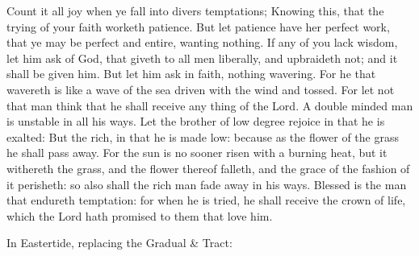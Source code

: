  Count it all joy when ye fall into divers temptations; Knowing this, that the trying of your faith worketh patience. But let patience have her perfect work, that ye may be perfect and entire, wanting nothing. If any of you lack wisdom, let him ask of God, that giveth to all men liberally, and upbraideth not; and it shall be given him. But let him ask in faith, nothing wavering. For he that wavereth is like a wave of the sea driven with the wind and tossed. For let not that man think that he shall receive any thing of the Lord. A double minded man is unstable in all his ways. Let the brother of low degree rejoice in that he is exalted: But the rich, in that he is made low: because as the flower of the grass he shall pass away. For the sun is no sooner risen with a burning heat, but it withereth the grass, and the flower thereof falleth, and the grace of the fashion of it perisheth: so also shall the rich man fade away in his ways. Blessed is the man that endureth temptation: for when he is tried, he shall receive the crown of life, which the Lord hath promised to them that love him.


\begin{rubric}
{In Eastertide, replacing the Gradual \& Tract:}
\end{rubric}\par\noindent


